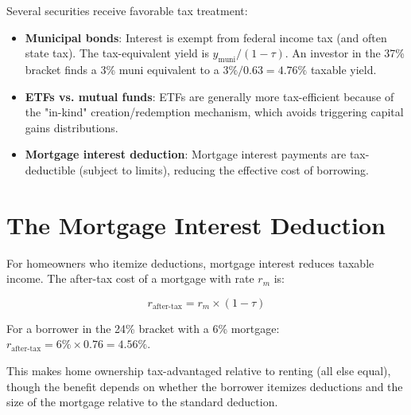 \documentclass[11pt,letterpaper]{report}
\begin{document}
Several securities receive favorable tax treatment:

\begin{itemize}
  \item \textbf{Municipal bonds}: Interest is exempt from federal income tax (and often state tax).  The tax-equivalent yield is $y_{\text{muni}} / (1 - \tau)$.  An investor in the 37\% bracket finds a 3\% muni equivalent to a $3\% / 0.63 = 4.76\%$ taxable yield.
  \item \textbf{ETFs vs. mutual funds}: ETFs are generally more tax-efficient because of the "in-kind" creation/redemption mechanism, which avoids triggering capital gains distributions.
  \item \textbf{Mortgage interest deduction}: Mortgage interest payments are tax-deductible (subject to limits), reducing the effective cost of borrowing.
\end{itemize}

\section{The Mortgage Interest Deduction}


For homeowners who itemize deductions, mortgage interest reduces taxable income.  The after-tax cost of a mortgage with rate $r_m$ is:

$$r_{\text{after-tax}} = r_m \times (1 - \tau)$$

For a borrower in the 24\% bracket with a 6\% mortgage: $r_{\text{after-tax}} = 6\% \times 0.76 = 4.56\%$.

This makes home ownership tax-advantaged relative to renting (all else equal), though the benefit depends on whether the borrower itemizes deductions and the size of the mortgage relative to the standard deduction.
\end{document}
